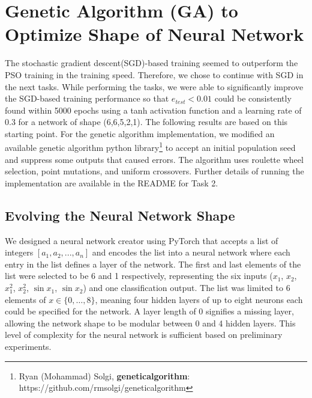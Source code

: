 \documentclass[12pt]{article}
\begin{document}
\section{Genetic Algorithm (GA) to Optimize Shape of Neural Network}
The stochastic gradient descent(SGD)-based training seemed to outperform the PSO training in the training speed. Therefore, we chose to continue with SGD in the next tasks. While performing the tasks, we were able to significantly improve the SGD-based training performance so that $e_{test}<0.01$ could be consistently found within 5000 epochs using a tanh activation function and a learning rate of 0.3 for a network of shape (6,6,5,2,1). The following results are based on this starting point. For the genetic algorithm implementation, we modified an available genetic algorithm python library\footnote{Ryan (Mohammad) Solgi, \textbf{geneticalgorithm}: https://github.com/rmsolgi/geneticalgorithm} to accept an initial population seed and suppress some outputs that caused errors. The algorithm uses roulette wheel selection, point mutations, and uniform crossovers. Further details of running the implementation are available in the README for Task 2.

\subsection{Evolving the Neural Network Shape}
We designed a neural network creator using PyTorch that accepts a list of integers $[a_1,a_2,...,a_n]$ and encodes the list into a neural network where each entry in the list defines a layer of the network. The first and last elements of the list were selected to be 6 and 1 respectively, representing the six inputs ($x_1$, $x_2$, $x_1^2$, $x_2^2$, $\sin x_1$, $\sin x_2$) and one classification output. The list was limited to 6 elements of $x \in \{0,\ldots,8\}$, meaning four hidden layers of up to eight neurons each could be specified for the network. A layer length of 0 signifies a missing layer, allowing the network shape to be modular between 0 and 4 hidden layers. This level of complexity for the neural network is sufficient based on preliminary experiments.
\end{document}
